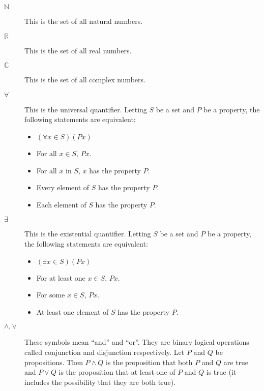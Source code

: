 \documentclass[12pt]{article}
\begin{document}
\begin{description}
  \item[$\mathbb{N}$] This is the set of all natural numbers. 

  \item[$\mathbb{R}$] This is the set of all real numbers. 

  \item[$\mathbb{C}$] This is the set of all complex numbers. 

  \item[$\forall$] This is the universal quantifier.  Letting $S$ be a
    set and $P$ be a property, the following statements are
    equivalent: 
    \begin{itemize}
    \item $(\forall x\in S)(Px)$ 
    \item For all $x\in S$, $Px$. 
    \item For all $x$ in $S$, $x$ has the property $P$. 
    \item Every element of $S$ has the property $P$. 
    \item Each element of $S$ has the property $P$. 
    \end{itemize}

  \item[$\exists$] This is the existential quantifier.  Letting $S$ be
    a set and $P$ be a property, the following statements are
    equivalent: 
    \begin{itemize}
    \item $(\exists x\in S)(Px)$ 
    \item For at least one $x\in S$, $Px$. 
    \item For some $x\in S$, $Px$. 
    \item At least one element of $S$ has the property $P$. 
    \end{itemize}

  \item[$\wedge,\vee$] These symbols mean ``and'' and ``or''.  They
    are binary logical operations called conjunction and disjunction
    respectively.  Let $P$ and $Q$ be propositions.  Then $P\wedge Q$
    is the proposition that both $P$ and $Q$ are true and $P\vee Q$ is
    the proposition that at least one of $P$ and $Q$ is true (it
    includes the possibility that they are both true).


\end{description}
\end{document}
